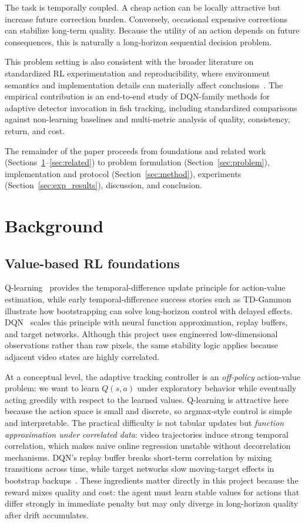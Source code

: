 \documentclass[letterpaper]{article}
\begin{document}
The task is temporally coupled. A cheap action can be locally attractive but increase future correction burden. Conversely, occasional expensive corrections can stabilize long-term quality. Because the utility of an action depends on future consequences, this is naturally a long-horizon sequential decision problem.

This problem setting is also consistent with the broader literature on standardized RL experimentation and reproducibility, where environment semantics and implementation details can materially affect conclusions~\cite{gymapi,gymstep,sb3,cleanrldocs}. The empirical contribution is an end-to-end study of DQN-family methods for adaptive detector invocation in fish tracking, including standardized comparisons against non-learning baselines and multi-metric analysis of quality, consistency, return, and cost.

The remainder of the paper proceeds from foundations and related work (Sections~\ref{sec:background}--\ref{sec:related}) to problem formulation (Section~\ref{sec:problem}), implementation and protocol (Section~\ref{sec:method}), experiments (Section~\ref{sec:exp_results}), discussion, and conclusion.

\section{Background}
\label{sec:background}
\subsection{Value-based RL foundations}
Q-learning~\cite{watkins1992q} provides the temporal-difference update principle for action-value estimation, while early temporal-difference success stories such as TD-Gammon~\cite{tesauro1995td} illustrate how bootstrapping can solve long-horizon control with delayed effects. DQN~\cite{mnih2015human} scales this principle with neural function approximation, replay buffers, and target networks. Although this project uses engineered low-dimensional observations rather than raw pixels, the same stability logic applies because adjacent video states are highly correlated.

At a conceptual level, the adaptive tracking controller is an \emph{off-policy} action-value problem: we want to learn $Q(s,a)$ under exploratory behavior while eventually acting greedily with respect to the learned values. Q-learning is attractive here because the action space is small and discrete, so argmax-style control is simple and interpretable. The practical difficulty is not tabular updates but \emph{function approximation under correlated data}: video trajectories induce strong temporal correlation, which makes naive online regression unstable without decorrelation mechanisms. DQN's replay buffer breaks short-term correlation by mixing transitions across time, while target networks slow moving-target effects in bootstrap backups~\cite{mnih2015human}. These ingredients matter directly in this project because the reward mixes quality and cost: the agent must learn stable values for actions that differ strongly in immediate penalty but may only diverge in long-horizon quality after drift accumulates.
\end{document}
